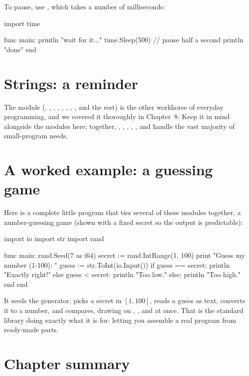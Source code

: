 To pause, use , which takes a number of milliseconds:

\begin{salamen}
import time

func main:
    println "wait for it..."
    time.Sleep(500)        // pause half a second
    println "done"
end
\end{salamen}

\section{Strings: a reminder}

The  module (, , , ,
, , , , and the rest) is the
other workhorse of everyday programming, and we covered it thoroughly in
Chapter~8. Keep it in mind alongside the modules here; together, ,
, , , , and  handle the vast
majority of small-program needs.

\section{A worked example: a guessing game}

Here is a complete little program that ties several of these modules together, a
number-guessing game (shown with a fixed secret so the output is predictable):

\begin{salamen}
import io
import str
import rand

func main:
    rand.Seed(7 as i64)
    secret := rand.IntRange(1, 100)
    print "Guess my number (1-100): "
    guess := str.ToInt(io.Input())
    if guess == secret:
        println "Exactly right!"
    else guess < secret:
        println "Too low."
    else:
        println "Too high."
    end
end
\end{salamen}

It seeds the generator, picks a secret in $[1, 100]$, reads a guess as text,
converts it to a number, and compares, drawing on , , and
 at once. That is the standard library doing exactly what it is for:
letting you assemble a real program from ready-made parts.

\section{Chapter summary}

